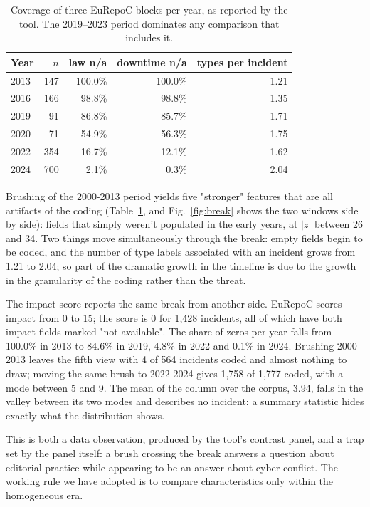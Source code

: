 \documentclass[conference]{IEEEtran}
\begin{document}
\begin{table}[t]
\caption{Coverage of three EuRepoC blocks per year, as reported by the tool. The 2019–2023 period dominates any comparison that includes it.}
\label{tab:coverage}
\centering
\begin{tabular}{@{}lrrrr@{}}
\toprule
Year & $n$ & law n/a & downtime n/a & types per incident \\
\midrule
2013 & 147 & 100.0\% & 100.0\% & 1.21 \\
2016 & 166 & 98.8\%  & 98.8\%  & 1.35 \\
2019 & 91  & 86.8\%  & 85.7\%  & 1.71 \\
2020 & 71  & 54.9\%  & 56.3\%  & 1.75 \\
2022 & 354 & 16.7\%  & 12.1\%  & 1.62 \\
2024 & 700 & 2.1\%   & 0.3\%   & 2.04 \\
\bottomrule
\end{tabular}
\end{table}

Brushing of the 2000-2013 period yields five "stronger" features that are all artifacts of the coding (Table~\ref{tab:coverage}, and Fig.~\ref{fig:break} shows the two windows side by side): fields that simply weren't populated in the early years, at $|z|$ between 26 and 34. Two things move simultaneously through the break: empty fields begin to be coded, and the number of type labels associated with an incident grows from 1.21 to 2.04; so part of the dramatic growth in the timeline is due to the growth in the granularity of the coding rather than the threat.

The impact score reports the same break from another side. EuRepoC scores impact from 0 to 15; the score is 0 for 1,428 incidents, all of which have both impact fields marked "not available". The share of zeros per year falls from 100.0\% in 2013 to 84.6\% in 2019, 4.8\% in 2022 and 0.1\% in 2024. Brushing 2000-2013 leaves the fifth view with 4 of 564 incidents coded and almost nothing to draw; moving the same brush to 2022-2024 gives 1,758 of 1,777 coded, with a mode between 5 and 9. The mean of the column over the corpus, 3.94, falls in the valley between its two modes and describes no incident: a summary statistic hides exactly what the distribution shows.

This is both a data observation, produced by the tool's contrast panel, and a trap set by the panel itself: a brush crossing the break answers a question about editorial practice while appearing to be an answer about cyber conflict. The working rule we have adopted is to compare characteristics only within the homogeneous era.  
\end{document}
